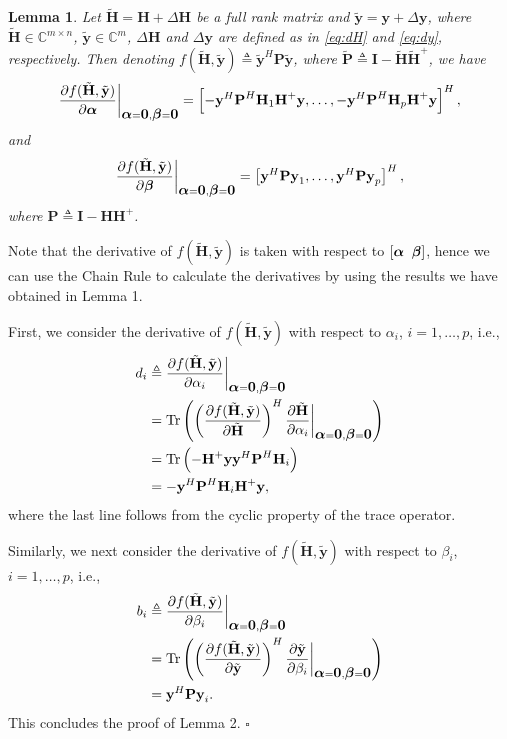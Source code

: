 \documentclass[review,sort&compress]{elsarticle}
\newtheorem{lem}{Lemma}
\renewcommand{\vec}[1]{\mbox{$\mathbf{#1}$}}
\newcommand{\defi}{\triangleq}
\newcommand{\tr}{\mathrm{Tr}}
\newcommand{\nn}{\nonumber}
\newcommand{\C}{\mathbb{C}}
\newcommand{\vH}{\vec{H}}
\newcommand{\vy}{\vec{y}}
\newcommand{\dH}{\Delta\vH}
\newcommand{\dy}{\Delta\vy}
\newcommand{\tH}{\tilde{\vec{H}}}
\newcommand{\ty}{\tilde{\vec{y}}}
\newcommand{\tP}{\tilde{\vec{P}}}
\newcommand{\vP}{\vec{P}}
\newcommand{\vI}{\vec{I}}
\newcommand{\va}{\mbox{\boldmath$\alpha$}}
\newcommand{\vbet}{\mbox{\boldmath$\beta$}}
\begin{document}
\begin{lem}\label{lem2}
Let $\tH =\vH+\dH$ be a full rank matrix and $\ty=\vy+\dy$, where $\tH \in \C^{m \times n}$, $\ty \in \C^m$, $\dH$ and $\dy$ are defined as in \eqref{eq:dH} and \eqref{eq:dy}, respectively. Then denoting $f\left(\tH, \ty \right) \triangleq \ty^H\vP\ty$, where $\tP \triangleq \vI-\tH\tH^+$, we have
\begin{equation}
  \dfrac{\partial f(\tH, \ty)}{\partial \va} \bigg\vert_{\va = \vec{0}, \vbet = \vec{0}} = \left[ - \vy^H \vP^H \vH_1 \vH^+ \vy, \dots,  - \vy^H \vP^H \vH_p \vH^+ \vy \right]^H,
\end{equation}
and
\begin{equation}
  \dfrac{\partial f(\tH, \ty)}{\partial \vbet} \bigg\vert_{\va = \vec{0}, \vbet = \vec{0}} = \left[ \vy^H \vP \vy_1, \dots,  \vy^H \vP \vy_p \right]^H,
\end{equation}
where $\vP \triangleq \vI-\vH\vH^+$.
\end{lem}

\begin{pol2}
Note that the derivative of $f\left(\tH, \ty \right)$ is taken with respect to $[\va \;\; \vbet]$, hence we can use the Chain Rule to calculate the derivatives by using the results we have obtained in Lemma 1.

First, we consider the derivative of $f\left(\tH, \ty \right)$ with respect to $\alpha_i$, $i = 1,\dots,p$, i.e.,
\begin{align}
  d_i & \defi \dfrac{\partial f(\tH, \ty)}{\partial \alpha_i} \bigg\vert_{\va = \vec{0}, \vbet = \vec{0}} \nn\\
      & = \tr \left( \left( \dfrac{\partial f(\tH, \ty)}{\partial \tH} \right)^H  \dfrac{\partial \tH}{\partial \alpha_i} \bigg\vert_{\va = \vec{0}, \vbet = \vec{0}} \right) \nn\\
      & = \tr \left( - \vH^+ \vy \vy^H \vP^H \vH_i \right) \nn\\
      & = - \vy^H \vP^H \vH_i \vH^+ \vy, \nn
\end{align}
where the last line follows from the cyclic property of the trace operator.


Similarly, we next consider the derivative of $f\left(\tH, \ty \right)$ with respect to $\beta_i$, $i = 1,\dots,p$, i.e.,
\begin{align}
  b_i & \defi \dfrac{\partial f(\tH, \ty)}{\partial \beta_i} \bigg\vert_{\va = \vec{0}, \vbet = \vec{0}} \nn\\
      & = \tr \left( \left( \dfrac{\partial f(\tH, \ty)}{\partial \ty} \right)^H  \dfrac{\partial \ty}{\partial \beta_i} \bigg\vert_{\va = \vec{0}, \vbet = \vec{0}} \right) \nn\\
      & = \vy^H \vP \vy_i. \nn
\end{align}
This concludes the proof of Lemma 2. \hfill $\square$
\end{pol2}
\end{document}
